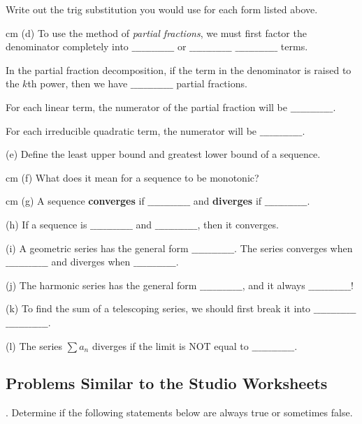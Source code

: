 \documentclass[12pt]{article}
\begin{document}
\bigskip
\noindent Write out the trig substitution you would use for each form listed 
above.

 cm
\noindent (d) To use the method of {\it partial fractions\/}, we must first 
factor the denominator completely into $\_\_\_\_\_\_\_\_\_\_\_\_\_$ or 
$\_\_\_\_\_\_\_\_\_\_\_\_\_$ $\_\_\_\_\_\_\_\_\_\_\_\_\_$ terms. 

\bigskip
\noindent In the partial fraction decomposition, if the term in the 
denominator is raised to the $k$th power, then we have 
$\_\_\_\_\_\_\_\_\_\_\_\_\_$ partial fractions. 

\bigskip
\noindent For each linear term, the numerator of the partial fraction will 
be $\_\_\_\_\_\_\_\_\_\_\_\_\_$.

\bigskip
\noindent For each irreducible quadratic term, the numerator will be 
$\_\_\_\_\_\_\_\_\_\_\_\_\_$.

\bigskip
\noindent (e) Define the least upper bound and greatest lower bound of a 
sequence.

 cm
\noindent (f) What does it mean for a sequence to be monotonic?

 cm
\noindent (g) A sequence {\bf converges} if $\_\_\_\_\_\_\_\_\_\_\_\_\_$ and 
{\bf diverges} if $\_\_\_\_\_\_\_\_\_\_\_\_\_$.

\bigskip
\noindent (h) If a sequence is $\_\_\_\_\_\_\_\_\_\_\_\_\_$ and 
$\_\_\_\_\_\_\_\_\_\_\_\_\_$, then it converges.

\bigskip
\noindent (i) A geometric series has the general form 
$\_\_\_\_\_\_\_\_\_\_\_\_\_$.  \hfil\break
The series converges when 
$\_\_\_\_\_\_\_\_\_\_\_\_\_$ and diverges when 
$\_\_\_\_\_\_\_\_\_\_\_\_\_$.

\medskip
\noindent (j) The harmonic series  has the general 
form $\_\_\_\_\_\_\_\_\_\_\_\_\_$, and it always $\_\_\_\_\_\_\_\_\_\_\_\_\_$!

\medskip 
\noindent (k) To find the sum of a telescoping series, we should first break it 
into  $\_\_\_\_\_\_\_\_\_\_\_\_\_$ $\_\_\_\_\_\_\_\_\_\_\_\_\_$. 

\bigskip
\noindent (l) The series $\sum a_n$ diverges if the limit is NOT equal to 
$\_\_\_\_\_\_\_\_\_\_\_\_\_$.

\subsection*{Problems Similar to the Studio Worksheets}

.  Determine if the following statements below are always true 
or sometimes false.
\end{document}
